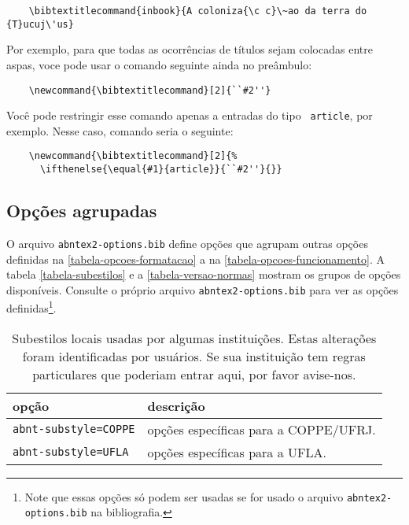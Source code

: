 \documentclass[a4paper]{ltxdoc}
\begin{document}
\begin{verbatim}
    \bibtextitlecommand{inbook}{A coloniza{\c c}\~ao da terra do {T}ucuj\'us}
\end{verbatim}

Por exemplo, para que todas as ocorrências de títulos sejam colocadas entre
aspas, voce pode usar o comando seguinte ainda no preâmbulo:

\begin{verbatim}
    \newcommand{\bibtextitlecommand}[2]{``#2''}
\end{verbatim}

Você pode restringir esse comando apenas a entradas do tipo {\tt
article}, por exemplo. Nesse caso, comando seria o seguinte:

\begin{verbatim}
    \newcommand{\bibtextitlecommand}[2]{%
      \ifthenelse{\equal{#1}{article}}{``#2''}{}}
\end{verbatim}


\subsection{Opções agrupadas}

O arquivo {\tt abntex2-options.bib} define opções que agrupam outras opções
definidas na \autoref{tabela-opcoes-formatacao} a na
\autoref{tabela-opcoes-funcionamento}. A tabela \autoref{tabela-subestilos} e a
\autoref{tabela-versao-normas} mostram os grupos de opções disponíveis. Consulte
o próprio arquivo {\tt abntex2-options.bib} para ver as opções 
definidas\footnote{Note que essas opções só podem ser usadas se for usado o
arquivo {\tt abntex2-options.bib} na bibliografia.}.

\begin{table}[htbp]

\caption[Subestilos de diversas instituições]{
Subestilos locais usadas por algumas instituições. Estas alterações
foram identificadas por usuários. Se sua instituição
tem regras particulares que poderiam entrar aqui, por favor avise-nos.}
\label{tabela-subestilos}

\begin{center}
\begin{tabular}{lp{9cm}}\hline\hline
opção  & descrição \\ \hline
{\tt abnt-substyle=COPPE} & opções específicas para a COPPE/UFRJ.\\
{\tt abnt-substyle=UFLA} & opções específicas para a UFLA.\\
\hline\hline
\end{tabular}
\end{center}
\end{table}
\end{document}
